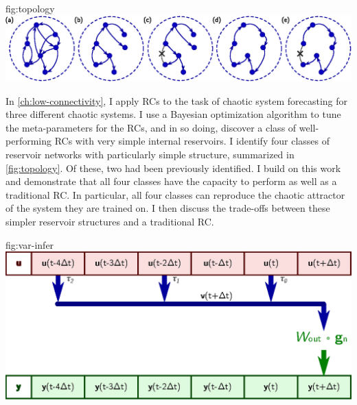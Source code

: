 \begin{reusefigure}{fig:topology}
  \includegraphics[width=\textwidth]{figures/topology}
  \caption{The five reservoir structures tested. Only internal
    reservoir connections are pictured. Connections to the reservoir
    computer input, or to the output layer are not shown. (a) A
    general, fixed in-degree network, here pictured with $N=7$ and
    $k=2$. (b) A $k=1$ network with a single connected component. (c)
    A $k=1$ network with the single cycle cut at an arbitrary
    point. (d) A \emph{simple cycle reservoir}. (e) A \emph{delay line
      reservoir}.}%
\end{reusefigure}

In \cref{ch:low-connectivity}, I apply RCs to the task of chaotic
system forecasting for three different chaotic systems. I use a
Bayesian optimization algorithm to tune the meta-parameters for the
RCs, and in so doing, discover a class of well-performing RCs with
very simple internal reservoirs. I identify four classes of reservoir
networks with particularly simple structure, summarized in
\cref{fig:topology}. Of these, two had been previously identified. I
build on this work and demonstrate that all four classes have the
capacity to perform as well as a traditional RC. In particular, all
four classes can reproduce the chaotic attractor of the system they
are trained on. I then discuss the trade-offs between these simpler
reservoir structures and a traditional RC.

\begin{reusefigure}{fig:var-infer}
  \includegraphics{figures/var-infer}
  \caption{Summary of the (N)VAR method. Many time-delay taps $\tau_i$
    of the discrete-time signal $\bm{u}(t)$ (top, red) are concatenated into the tap
    vector $\bm{v}(t)$ (middle, blue). Here, there are three taps
    $\tau_0=0$, $\tau_1=2$, and $\tau_2=4$. These taps are then passed
    through a possibly nonlinear function $\bm{g}_\text{n}$ and
    combined linearly by the output matrix $W_\text{out}$ to produce
    the next value of the (N)VAR's output $\bm{y}(t)$ (bottom,
    green). For a linear VAR, $\bm{g}_\text{n}$ is the identity
    function. To transform a whole time series input, this (N)VAR process
    slides along the time axis from left to right.}
\end{reusefigure}

